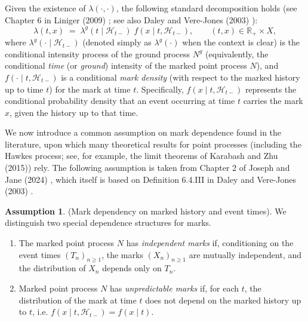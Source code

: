 \documentclass[12pt,a4paper]{report}
\theoremstyle{plain}
\theoremstyle{definition}
\newtheorem{assumption}{Assumption}[section]
\theoremstyle{remark}
\newcommand{\1}{\mathbf{1}}
\begin{document}
\medskip
\noindent
Given the existence of $\lambda(\cdot,\cdot)$, the following standard decomposition holds (see Chapter 6 in Liniger (2009) \cite{Lin09}; see also Daley and Vere-Jones (2003) \cite{DVJ03}):
\begin{equation}\label{eq:factorization_ground_mark}
\lambda(t,x)\;=\;\lambda^{g}(t\mid \mathcal{H}_{t-})\; f(x\mid t,\mathcal{H}_{t-}), \qquad  (t,x) \in \mathbb{R}_+ \times X,
\end{equation}
where $\lambda^{g}(\cdot\mid \mathcal{H}_{t-})$ (denoted simply as $\lambda^{g}(\cdot)$ when the context is clear) is the conditional intensity process of the ground process $N^g$ (equivalently, the conditional \emph{time} (or \emph{ground}) intensity of the marked point process $N$), and $f(\cdot\mid t,\mathcal{H}_{t-})$ is a conditional \emph{mark density} (with respect to the marked history up to time $t$) for the mark at time $t$. Specifically, $f(x\mid t,\mathcal{H}_{t-})$ represents the conditional probability density that an event occurring at time $t$ carries the mark $x$, given the history up to that time.

\medskip
\noindent
We now introduce a common assumption on mark dependence found in the literature, upon which many theoretical results for point processes (including the Hawkes process; see, for example, the limit theorems of Karabash and Zhu (2015)\cite{KZ15}) rely. The following assumption is taken from Chapter 2 of Joseph and Jane (2024) \cite{JJ24}, which itself is based on Definition 6.4.III in Daley and Vere-Jones (2003) \cite{DVJ03}.

\begin{assumption}\label{assumption:mark-dependence}(Mark dependency on marked history and event times).
We distinguish two special dependence structures for marks.
\begin{enumerate}
\item[(i)] The marked point process $N$ has \emph{independent marks} if, conditioning on the event times $(T_n)_{n\ge 1}$, the marks $(X_n)_{n\ge 1}$ are mutually independent, and the distribution of $X_n$ depends only on $T_n$.

\item[(ii)] Marked point process $N$ has \emph{unpredictable marks} if, for each $t$, the distribution of the mark at time $t$ does not depend on the marked history up to $t$, i.e. $f(x\mid t,\mathcal{H}_{t-}) = f(x\mid t)$.
\end{enumerate}
\end{assumption}
\end{document}
